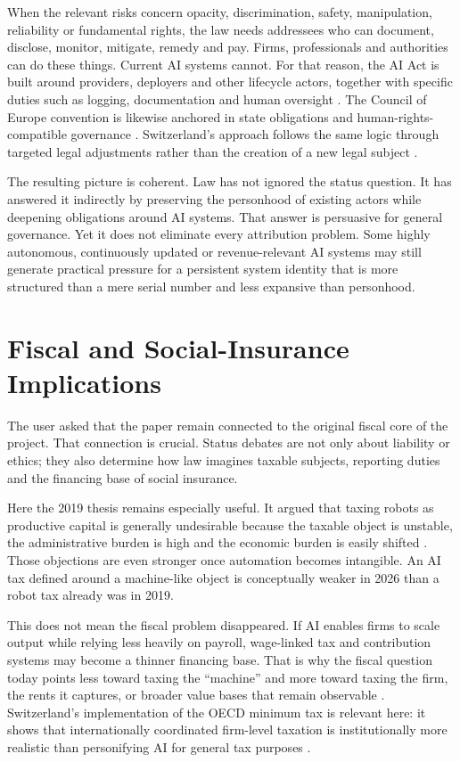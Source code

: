 \documentclass[11pt]{article}
\begin{document}
When the relevant risks concern opacity, discrimination, safety, manipulation, reliability or fundamental rights, the law needs addressees who can document, disclose, monitor, mitigate, remedy and pay. Firms, professionals and authorities can do these things. Current AI systems cannot. For that reason, the AI Act is built around providers, deployers and other lifecycle actors, together with specific duties such as logging, documentation and human oversight \citep{eu2024aiact,ec2026aiactfaq}. The Council of Europe convention is likewise anchored in state obligations and human-rights-compatible governance \citep{coe2024framework}. Switzerland's approach follows the same logic through targeted legal adjustments rather than the creation of a new legal subject \citep{ofcom2025swissai}.

The resulting picture is coherent. Law has not ignored the status question. It has answered it indirectly by preserving the personhood of existing actors while deepening obligations around AI systems. That answer is persuasive for general governance. Yet it does not eliminate every attribution problem. Some highly autonomous, continuously updated or revenue-relevant AI systems may still generate practical pressure for a persistent system identity that is more structured than a mere serial number and less expansive than personhood.

\section{Fiscal and Social-Insurance Implications}
The user asked that the paper remain connected to the original fiscal core of the project. That connection is crucial. Status debates are not only about liability or ethics; they also determine how law imagines taxable subjects, reporting duties and the financing base of social insurance.

Here the 2019 thesis remains especially useful. It argued that taxing robots as productive capital is generally undesirable because the taxable object is unstable, the administrative burden is high and the economic burden is easily shifted \citep{graz2019}. Those objections are even stronger once automation becomes intangible. An AI tax defined around a machine-like object is conceptually weaker in 2026 than a robot tax already was in 2019.

This does not mean the fiscal problem disappeared. If AI enables firms to scale output while relying less heavily on payroll, wage-linked tax and contribution systems may become a thinner financing base. That is why the fiscal question today points less toward taxing the ``machine'' and more toward taxing the firm, the rents it captures, or broader value bases that remain observable \citep{brollo2024,swissfdf2024pillar2}. Switzerland's implementation of the OECD minimum tax is relevant here: it shows that internationally coordinated firm-level taxation is institutionally more realistic than personifying AI for general tax purposes \citep{swissfdf2024pillar2}.
\end{document}
